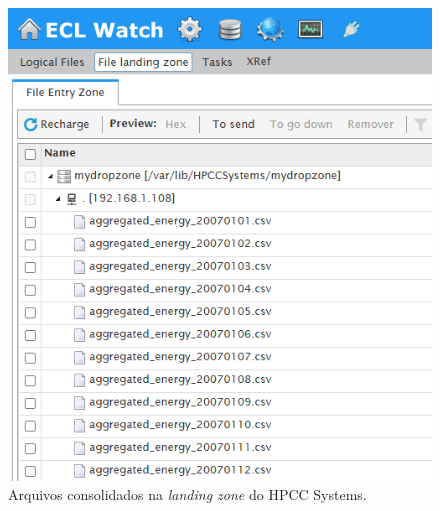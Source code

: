 \begin{figure}[htb]
    \caption{\label{fig:hpcc_landing_zone}Arquivos consolidados na \textit{landing zone} do HPCC Systems.}
    \begin{center}
        \includegraphics[width=0.7\linewidth]{images/hpcc_landing_zone.png}
    \end{center}
\end{figure}
